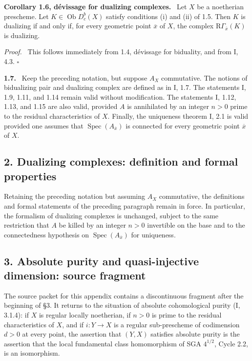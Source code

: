 \documentclass[12pt]{article}
\newcommand{\Spec}{\operatorname{Spec}}
\newcommand{\ob}{\operatorname{Ob}}
\newcommand{\R}{\mathrm R}
\newcommand{\ol}[1]{\overline{#1}}
\newcommand{\qedtext}{\hfill$\square$}
\newenvironment{statement}[1]{\par\medskip\noindent\textbf{#1.}\ }{\par\medskip}
\newenvironment{prooftext}[1][Proof]{\par\noindent\emph{#1.}\ }{\par\medskip}
\begin{document}
\begin{statement}{Corollary 1.6, dévissage for dualizing complexes}
Let $X$ be a noetherian prescheme. Let $K\in\ob D_c^b(X)$ satisfy conditions (i) and (ii) of 1.5. Then $K$ is dualizing if and only if, for every geometric point $\ol x$ of $X$, the complex $\R\Gamma_{\ol x}(K)$ is dualizing.
\end{statement}

\begin{prooftext}
This follows immediately from 1.4, dévissage for biduality, and from I, 4.3. \qedtext
\end{prooftext}

\begin{statement}{1.7}
Keep the preceding notation, but suppose $A_X$ commutative. The notions of bidualizing pair and dualizing complex are defined as in I, 1.7. The statements I, 1.9, 1.11, and 1.14 remain valid without modification. The statements I, 1.12, 1.13, and 1.15 are also valid, provided $A$ is annihilated by an integer $n>0$ prime to the residual characteristics of $X$. Finally, the uniqueness theorem I, 2.1 is valid provided one assumes that $\Spec(A_{\ol x})$ is connected for every geometric point $\ol x$ of $X$.
\end{statement}

\subsection*{2. Dualizing complexes: definition and formal properties}

Retaining the preceding notation but assuming $A_X$ commutative, the definitions and formal statements of the preceding paragraph remain in force. In particular, the formalism of dualizing complexes is unchanged, subject to the same restriction that $A$ be killed by an integer $n>0$ invertible on the base and to the connectedness hypothesis on $\Spec(A_{\ol x})$ for uniqueness.

\subsection*{3. Absolute purity and quasi-injective dimension: source fragment}

The source packet for this appendix contains a discontinuous fragment after the beginning of §3. It returns to the situation of absolute cohomological purity (I, 3.1.4): if $X$ is regular locally noetherian, if $n>0$ is prime to the residual characteristics of $X$, and if $i:Y\to X$ is a regular sub-prescheme of codimension $d>0$ at every point, the assertion that $(Y,X)$ satisfies absolute purity is the assertion that the local fundamental class homomorphism of SGA $4^{1/2}$, Cycle 2.2, is an isomorphism.
\end{document}
